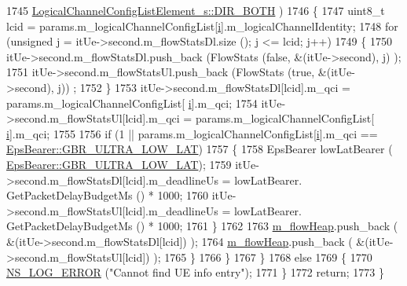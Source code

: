 \begin{DoxyCode}
1745                                 \hyperlink{structns3_1_1LogicalChannelConfigListElement__s_a0ce1e3a6af4d9a3e9fc19361d0af4e00abbf65338c16bef65cdedec87e8a7efaa}{LogicalChannelConfigListElement\_s::DIR\_BOTH}
      )
1746                 \{
1747                         uint8\_t lcid = params.m\_logicalChannelConfigList[\hyperlink{bernuolliDistribution_8m_a6f6ccfcf58b31cb6412107d9d5281426}{i}].m\_logicalChannelIdentity;
1748                         \textcolor{keywordflow}{for} (\textcolor{keywordtype}{unsigned} j = itUe->second.m\_flowStatsDl.size (); j <= lcid; j++)
1749                         \{
1750                                 itUe->second.m\_flowStatsDl.push\_back (FlowStats (\textcolor{keyword}{false}, &(itUe->second), j)
      );
1751                                 itUe->second.m\_flowStatsUl.push\_back (FlowStats (\textcolor{keyword}{true}, &(itUe->second), j))
      ;
1752                         \}
1753                         itUe->second.m\_flowStatsDl[lcid].m\_qci = params.m\_logicalChannelConfigList[
      \hyperlink{bernuolliDistribution_8m_a6f6ccfcf58b31cb6412107d9d5281426}{i}].m\_qci;
1754                         itUe->second.m\_flowStatsUl[lcid].m\_qci = params.m\_logicalChannelConfigList[
      \hyperlink{bernuolliDistribution_8m_a6f6ccfcf58b31cb6412107d9d5281426}{i}].m\_qci;
1755 
1756                         \textcolor{keywordflow}{if} (1 || params.m\_logicalChannelConfigList[\hyperlink{bernuolliDistribution_8m_a6f6ccfcf58b31cb6412107d9d5281426}{i}].m\_qci == 
      \hyperlink{structns3_1_1EpsBearer_aecf0c67109c5eb4ec0b07226fff5885ea1b3267491c7ea82ddc90b433c429c7c1}{EpsBearer::GBR\_ULTRA\_LOW\_LAT})
1757                         \{
1758                                 EpsBearer lowLatBearer (
      \hyperlink{structns3_1_1EpsBearer_aecf0c67109c5eb4ec0b07226fff5885ea1b3267491c7ea82ddc90b433c429c7c1}{EpsBearer::GBR\_ULTRA\_LOW\_LAT});
1759                                 itUe->second.m\_flowStatsDl[lcid].m\_deadlineUs = lowLatBearer.
      GetPacketDelayBudgetMs () * 1000;
1760                                 itUe->second.m\_flowStatsUl[lcid].m\_deadlineUs = lowLatBearer.
      GetPacketDelayBudgetMs () * 1000;
1761                         \}
1762 
1763                         \hyperlink{classns3_1_1MmWaveFlexTtiMaxRateMacScheduler_ab7efbde2b050b26442c6d9f9901f7217}{m\_flowHeap}.push\_back ( &(itUe->second.m\_flowStatsDl[lcid]) );
1764                         \hyperlink{classns3_1_1MmWaveFlexTtiMaxRateMacScheduler_ab7efbde2b050b26442c6d9f9901f7217}{m\_flowHeap}.push\_back ( &(itUe->second.m\_flowStatsUl[lcid]) );
1765                 \}
1766         \}
1767   \}
1768   \textcolor{keywordflow}{else}
1769   \{
1770         \hyperlink{group__logging_ga0261a8db1d4ac5f79417d117634fd455}{NS\_LOG\_ERROR} (\textcolor{stringliteral}{"Cannot find UE info entry"});
1771   \}
1772   \textcolor{keywordflow}{return};
1773 \}
\end{DoxyCode}


